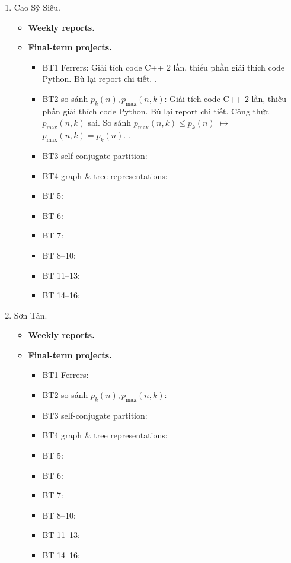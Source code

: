 \documentclass{article}
\begin{document}
\begin{enumerate}
    \item {\sc Cao Sỹ Siêu.}
    \begin{itemize}
        \item {\bf Weekly reports.}
        \item {\bf Final-term projects.}
        \begin{itemize}
            \item BT1 Ferrers: Giải tích code C++ 2 lần, thiếu phần giải thích code Python. Bù lại report chi tiết. .
            \item BT2 so sánh $p_k(n),p_{\max}(n,k)$: Giải tích code C++ 2 lần, thiếu phần giải thích code Python. Bù lại report chi tiết. Công thức $p_{\max}(n,k)$ sai. So sánh \st{$p_{\max}(n,k)\le p_k(n)$} $\mapsto$ $p_{\max}(n,k) = p_k(n)$. .
            \item BT3 self-conjugate partition:
            \item BT4 graph \& tree representations:
            \item BT 5:
            \item BT 6:
            \item BT 7:
            \item BT 8--10:
            \item BT 11--13:
            \item BT 14--16:
        \end{itemize}
    \end{itemize}
    \item {\sc Sơn Tân.}
    \begin{itemize}
        \item {\bf Weekly reports.}
        \item {\bf Final-term projects.}
        \begin{itemize}
            \item BT1 Ferrers:
            \item BT2 so sánh $p_k(n),p_{\max}(n,k)$:
            \item BT3 self-conjugate partition:
            \item BT4 graph \& tree representations:
            \item BT 5:
            \item BT 6:
            \item BT 7:
            \item BT 8--10:
            \item BT 11--13:
            \item BT 14--16:

\end{itemize}
\end{itemize}
\end{enumerate}
\end{document}
